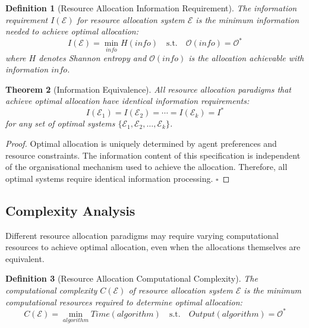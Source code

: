 \documentclass[12pt,a4paper]{article}
\newtheorem{theorem}{Theorem}
\newtheorem{definition}[theorem]{Definition}
\begin{document}
\begin{definition}[Resource Allocation Information Requirement]
The information requirement $I(\mathcal{E})$ for resource allocation system $\mathcal{E}$ is the minimum information needed to achieve optimal allocation:
\begin{equation}
I(\mathcal{E}) = \min_{info} H(info) \quad \text{s.t.} \quad \mathcal{O}(info) = \mathcal{O}^*
\end{equation}
where $H$ denotes Shannon entropy and $\mathcal{O}(info)$ is the allocation achievable with information $info$.
\end{definition}

\begin{theorem}[Information Equivalence]
All resource allocation paradigms that achieve optimal allocation have identical information requirements:
\begin{equation}
I(\mathcal{E}_1) = I(\mathcal{E}_2) = \cdots = I(\mathcal{E}_k) = I^*
\end{equation}
for any set of optimal systems $\{\mathcal{E}_1, \mathcal{E}_2, \ldots, \mathcal{E}_k\}$.
\end{theorem}

\begin{proof}
Optimal allocation is uniquely determined by agent preferences and resource constraints. The information content of this specification is independent of the organisational mechanism used to achieve the allocation. Therefore, all optimal systems require identical information processing. $\square$
\end{proof}

\subsection{Complexity Analysis}

Different resource allocation paradigms may require varying computational resources to achieve optimal allocation, even when the allocations themselves are equivalent.

\begin{definition}[Resource Allocation Computational Complexity]
The computational complexity $C(\mathcal{E})$ of resource allocation system $\mathcal{E}$ is the minimum computational resources required to determine optimal allocation:
\begin{equation}
C(\mathcal{E}) = \min_{algorithm} Time(algorithm) \quad \text{s.t.} \quad Output(algorithm) = \mathcal{O}^*
\end{equation}
\end{definition}
\end{document}
